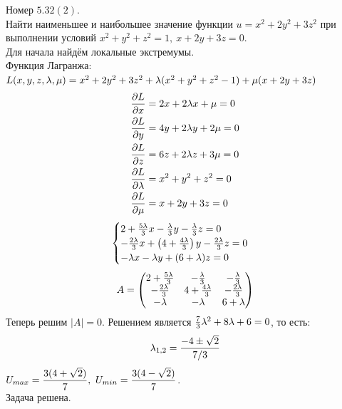 \begin{example}
	Номер $5.32(2)$.\\
	Найти наименьшее и наибольшее значение функции $u=x^2+2y^2+3z^2$ при выполнении условий $x^2+y^2+z^2=1,\ x+2y+3z=0$.\\
	Для начала найдём локальные экстремумы.\\
	Функция Лагранжа: $L(x,y,z,\lambda,\mu)=x^2+2y^2+3z^2+\lambda(x^2+y^2+z^2-1)+\mu(x+2y+3z)$
	\begin{equation*}
		\begin{split}
			\frac{\partial L}{\partial x}&=2x+2\lambda x+\mu=0\\
			\frac{\partial L}{\partial y}&=4y+2\lambda y+2\mu=0\\
			\frac{\partial L}{\partial z}&=6z+2\lambda z+3\mu=0\\
			\frac{\partial L}{\partial\lambda}&=x^2+y^2+z^2=0\\
			\frac{\partial L}{\partial\mu}&=x+2y+3z=0
		\end{split}
	\end{equation*}
	\begin{equation*}
		\begin{cases}
			2+\frac{5\lambda}3x-\frac{\lambda}3y-\frac{\lambda}3z=0\\
			-\frac{2\lambda}3x+\left(4+\frac{4\lambda}3\right)y-\frac{2\lambda}3z=0\\
			-\lambda x-\lambda y+(6+\lambda)z=0
		\end{cases}
	\end{equation*}
	\begin{equation*}
		A=
		\begin{pmatrix}
			2+\frac{5\lambda}3 & -\frac{\lambda}3 & -\frac{\lambda}3\\
			-\frac{2\lambda}3 & 4+\frac{4\lambda}3 & -\frac{2\lambda}3\\
			-\lambda & -\lambda & 6+\lambda
		\end{pmatrix}
	\end{equation*}
	Теперь решим $|A|=0$. Решением является $\frac73\lambda^2+8\lambda+6=0$, то есть:
	\[\lambda_{1,2}=\frac{-4\pm\sqrt2}{7/3}\]
	$\ds U_{max}=\frac{3(4+\sqrt2)}7,\ U_{min}=\frac{3(4-\sqrt2)}{7}$.\\
	Задача решена.
\end{example}
